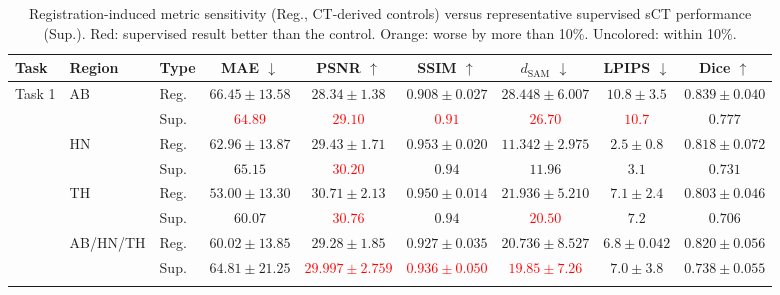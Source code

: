 \documentclass[lettersize,journal]{IEEEtran}
\begin{document}
\newcommand{\betterfloor}[1]{\textcolor{red}{#1}}
\newcommand{\worsefive}[1]{\textcolor{metricorange}{#1}}

\begin{table}[h!]
\centering
\scriptsize
\setlength{\tabcolsep}{4pt}
\renewcommand{\arraystretch}{1.12}
\caption{Registration-induced metric sensitivity (Reg., CT-derived controls) versus representative supervised sCT performance (Sup.). Red: supervised result better than the control. Orange: worse by more than 10\%. Uncolored: within 10\%.}
\label{tab:registration-supervised-comparison-all}
\begin{tabular}{lllcccccc}
\toprule
Task & Region & Type & MAE $\downarrow$ & PSNR $\uparrow$ & SSIM $\uparrow$ & $d_{\mathrm{SAM}}$ $\downarrow$ & LPIPS $\downarrow$ & Dice $\uparrow$ \\
\midrule

\multirow{10}{*}{Task 1}
& \multirow{2}{*}{AB} & Reg.
& $66.45 \pm 13.58$ & $28.34 \pm 1.38$ & $0.908 \pm 0.027$ & $28.448 \pm 6.007$ & $10.8 \pm 3.5$ & $0.839 \pm 0.040$ \\
& & Sup.
& \betterfloor{$64.89$} & \betterfloor{$29.10$} & \betterfloor{$0.91$} & \betterfloor{$26.70$} & \betterfloor{$10.7$} & $0.777$ \\

& \multirow{2}{*}{HN} & Reg.
& $62.96 \pm 13.87$ & $29.43 \pm 1.71$ & $0.953 \pm 0.020$ & $11.342 \pm 2.975$ & $2.5 \pm 0.8$ & $0.818 \pm 0.072$ \\
& & Sup.
& $65.15$ & \betterfloor{$30.20$} & $0.94$ & $11.96$ & \worsefive{$3.1$} & \worsefive{$0.731$} \\

& \multirow{2}{*}{TH} & Reg.
& $53.00 \pm 13.30$ & $30.71 \pm 2.13$ & $0.950 \pm 0.014$ & $21.936 \pm 5.210$ & $7.1 \pm 2.4$ & $0.803 \pm 0.046$ \\
& & Sup.
& \worsefive{$60.07$} & \betterfloor{$30.76$} & $0.94$ & \betterfloor{$20.50$} & $7.2$ & \worsefive{$0.706$} \\

& \multirow{2}{*}{AB/HN/TH} & Reg.
& $60.02 \pm 13.85$ & $29.28 \pm 1.85$ & $0.927 \pm 0.035$ & $20.736 \pm 8.527$ & $6.8 \pm 0.042$ & $0.820 \pm 0.056$ \\
& & Sup.
& $64.81 \pm 21.25$ & \betterfloor{$29.997 \pm 2.759$} & \betterfloor{$0.936 \pm 0.050$} & \betterfloor{$19.85 \pm 7.26$} & $7.0 \pm 3.8$ & $0.738 \pm 0.055$ \\

\cmidrule(lr){2-9}


\end{tabular}
\end{table}
\end{document}
